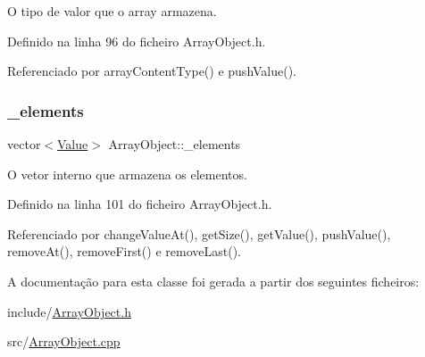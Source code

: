 O tipo de valor que o array armazena. 

Definido na linha 96 do ficheiro Array\+Object.\+h.



Referenciado por array\+Content\+Type() e push\+Value().

\mbox{\label{classArrayObject_a1d085d50c90613812fdf539472e76b0c}} 
\subsubsection{\texorpdfstring{\+\_\+elements}{\_elements}}
{\footnotesize\ttfamily vector$<$\hyperlink{structValue}{Value}$>$ Array\+Object\+::\+\_\+elements\hspace{0.3cm}{\ttfamily [private]}}

O vetor interno que armazena os elementos. 

Definido na linha 101 do ficheiro Array\+Object.\+h.



Referenciado por change\+Value\+At(), get\+Size(), get\+Value(), push\+Value(), remove\+At(), remove\+First() e remove\+Last().



A documentação para esta classe foi gerada a partir dos seguintes ficheiros\+:\begin{DoxyCompactItemize}
\item 
include/\hyperlink{ArrayObject_8h}{Array\+Object.\+h}\item 
src/\hyperlink{ArrayObject_8cpp}{Array\+Object.\+cpp}\end{DoxyCompactItemize}
